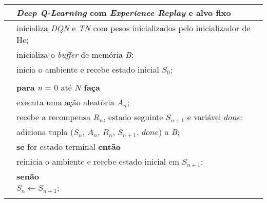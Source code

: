 \begin{tabular}{l l}

\hline
 & \textit{Deep Q-Learning} com \textit{Experience Replay} e alvo fixo\\
\hline

 & inicializa \textit{DQN} e \textit{TN} com pesos inicializados pelo inicializador de He;\\
 & inicializa o \textit{buffer} de memória \textit{B};\\
 & inicia o ambiente e recebe estado inicial $S_{0}$;\\
\\
 & \textbf{para} \textit{n} = 0 até $N$ \textbf{faça}\\
 & \qquad executa uma ação aleatória $A_{n}$;\\
 & \qquad recebe a recompensa $R_{n}$, estado seguinte $S_{n+1}$ e variável $done$;\\
 & \qquad adiciona tupla ($S_{n}$, $A_{n}$, $R_{n}$, $S_{n+1}$, $done$) a \textit{B};\\
 & \qquad \textbf{se} for estado terminal \textbf{então}\\
 & \qquad \qquad reinicia o ambiente e recebe estado inicial em $S_{n+1}$;\\
 & \qquad \textbf{senão}\\
 & \qquad \qquad $S_{n} \leftarrow S_{n+1};$ \\
\\


\end{tabular}
